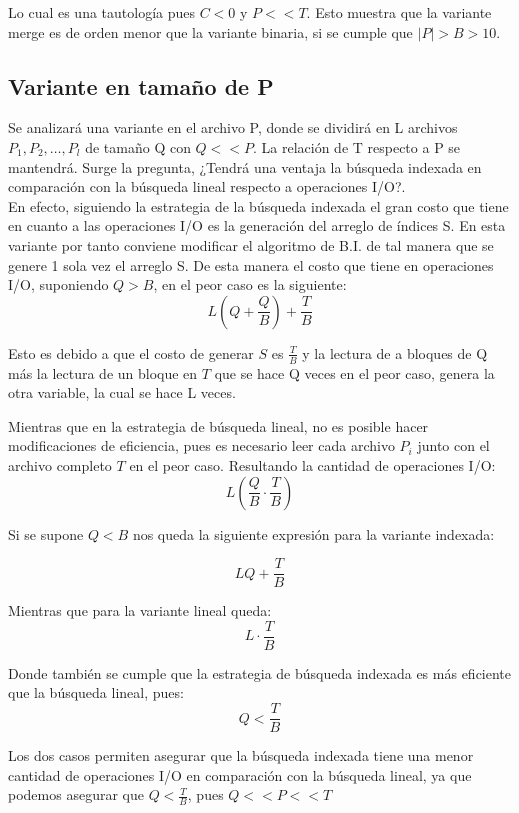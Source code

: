 \documentclass[11pt]{article}
\begin{document}
Lo cual es una tautología pues $C<0$ y $P<<T$. Esto muestra que la variante merge es de orden menor que la variante binaria, si se cumple que $|P| > B > 10$.


\subsection{Variante en tamaño de P}
Se analizará una variante en el archivo P, donde se dividirá en L archivos $P_1, P_2, \ldots, P_l$ de tamaño Q con $Q<<P$. La relación de T respecto a P se mantendrá. Surge la pregunta, ¿Tendrá una ventaja la búsqueda indexada en comparación con la búsqueda lineal respecto a operaciones I/O?. \\
\newline
En efecto, siguiendo la estrategia de la búsqueda indexada el gran costo que tiene en cuanto a las operaciones I/O es la generación del arreglo de índices S. En esta variante por tanto conviene modificar el algoritmo de B.I. de tal manera que se genere 1 sola vez el arreglo S. De esta manera el costo que tiene en operaciones I/O, suponiendo $Q>B$, en el peor caso es la siguiente:
$$
L\left(Q + \frac{Q}{B}\right) + \frac{T}{B}
$$

Esto es debido a que el costo de generar $S$ es $\frac{T}{B}$ y la lectura de a bloques de Q más la lectura de un bloque en $T$ que se hace Q veces en el peor caso, genera la otra variable, la cual se hace L veces.

Mientras que en la estrategia de búsqueda lineal, no es posible hacer modificaciones de eficiencia, pues es necesario leer cada archivo $P_i$ junto con el archivo completo $T$ en el peor caso. Resultando la cantidad de operaciones I/O:
$$
L\left(\frac{Q}{B} \cdot \frac{T}{B}\right)
$$

\newpage

Si se supone $Q<B$ nos queda la siguiente expresión para la variante indexada:

$$
LQ + \frac{T}{B}
$$

Mientras que para la variante lineal queda:
$$
L \cdot \frac{T}{B}
$$

Donde también se cumple que la estrategia de búsqueda indexada es más eficiente que la búsqueda lineal, pues:
$$
Q<\frac{T}{B}
$$

Los dos casos permiten asegurar que la búsqueda indexada tiene una menor cantidad de operaciones I/O en comparación con la búsqueda lineal, ya que podemos asegurar que $Q<\frac{T}{B}$, pues $Q<<P<<T$
\end{document}
